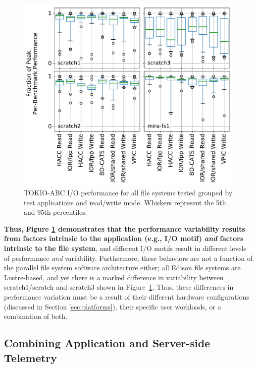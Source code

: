 \begin{figure}[t]
    \centering
    \includegraphics[width=1.0\columnwidth]{figs/perf-boxplots.pdf}
    \caption{TOKIO-ABC I/O performance for all file systems tested grouped by test
    applications and read/write mode.  Whiskers represent the 5th and 95th
    percentiles.}
    \label{fig:perf-summary-boxplots-motif}
\end{figure}

\textbf{Thus, Figure \ref{fig:perf-summary-boxplots-motif} demonstrates that the
performance variability results from factors intrinsic to the application (e.g., I/O motif) \emph{and} factors intrinsic to the file system}, and
different I/O motifs result in different levels of performance \emph{and} variability.
Furthermore, these behaviors are not a function of the parallel file system software architecture either; all Edison file systems are Lustre-based, and yet there is a marked difference in variability between scratch1/scratch and scratch3 shown in Figure~\ref{fig:perf-summary-boxplots-motif}.
Thus, these differences in performance variation must be a result of their different hardware configurations (discussed in Section \ref{sec:platforms}), their specific user workloads, or a combination of both.

\subsection{Combining Application and Server-side Telemetry} \label{sec:results/combining}

